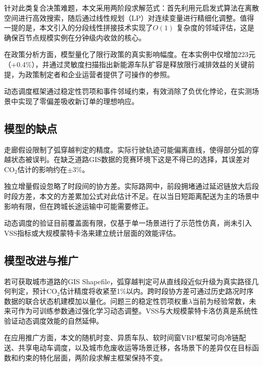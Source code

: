 \documentclass[12pt,a4paper]{article}
\begin{document}
针对此类复合决策难题，本文采用两阶段求解范式：首先利用元启发式算法在离散空间进行高效搜索，随后通过线性规划（LP）对连续变量进行精细化调整。值得一提的是，本文引入的分段线性拼接技术实现了$O(1)$ 复杂度的邻域评估，这是确保百节点规模实例在分钟级内收敛的核心。

在政策分析方面，模型量化了限行政策的真实影响幅度。在本实例中仅增加223元（+0.4\%），并通过灵敏度扫描指出新能源车队扩容是释放限行减排效益的关键前提，为政策制定者和企业运营者提供了可操作的参照。

动态调度框架通过稳定性罚项和事件邻域约束，有效消除了负优化悖论，在实测场景中实现了零偏差吸收新订单的理想响应。

\subsection{模型的缺点}

走廊假设限制了弧穿越判定的精度。实际行驶轨迹可能偏离直线，使得部分弧的穿越状态被误判。在缺乏道路GIS数据的竞赛环境下这是不得已的选择，其误差对CO$_2$估计的影响约在$\pm$3\%。

独立增量假设忽略了时段间的协方差。实际路网中，前段拥堵通过延迟链放大后段时段方差，本文的方差累加公式对此估计不足。在以当日短距离配送为主的场景中影响有限，但在跨城长途运输中可能需要修正。

动态调度的验证目前覆盖面有限，仅基于单一场景进行了示范性仿真，尚未引入VSS指标或大规模蒙特卡洛来建立统计层面的效能评估。

\subsection{模型改进与推广}

若可获取城市道路的GIS Shapefile，弧穿越判定可从直线段近似升级为真实路径几何判定，预计CO$_2$估计精度将收紧至1\%以内。跨时段协方差可通过历史路况时序数据的联合状态机建模加以量化。问题三的稳定性罚项权重$\lambda$当前为经验常数，未来可作为可训练参数通过强化学习动态调整。VSS与大规模蒙特卡洛仿真是系统性验证动态调度效能的自然延伸。

在应用推广方面，本文的随机时变、异质车队、软时间窗VRP框架可向冷链配送、共享电动车调度，以及城市危废收运等场景迁移，各场景下的差异仅在目标函数和约束的特化层面，两阶段求解主框架保持不变。
\end{document}
